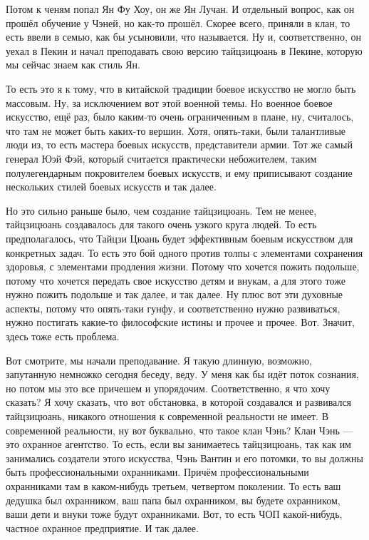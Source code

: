 Потом к ченям попал Ян Фу Хоу,  
он же Ян Лучан.  И отдельный вопрос, как он прошёл 
обучение у Чэней, но как-то прошёл. Скорее всего, 
приняли в клан, то есть ввели в семью, как бы усыновили, 
что называется.  Ну и, соответственно, он уехал в Пекин 
и начал преподавать свою версию тайцзицюань в 
Пекине,  которую мы сейчас знаем как стиль Ян.

То есть 
это я к тому,  что в китайской традиции боевое 
искусство не могло быть массовым. Ну, за исключением 
вот этой военной темы. Но военное боевое искусство, ещё
раз, было каким-то очень ограниченным в плане, ну,  
считалось, что там не может быть каких-то вершин.  Хотя, 
опять-таки,  были талантливые люди из, то есть мастера 
боевых искусств, представители армии. Тот же самый 
генерал Юэй Фэй, который считается практически 
небожителем,  таким полулегендарным покровителем 
боевых искусств,  и ему приписывают создание 
нескольких стилей боевых искусств и так далее.

Но это 
сильно раньше было,  чем создание тайцзицюань. Тем не 
менее,  тайцзицюань создавалось для такого очень 
узкого круга людей.  То есть предполагалось, что Тайцзи 
Цюань будет эффективным боевым искусством для 
конкретных задач. То есть это бой одного против толпы 
с элементами сохранения здоровья, с элементами 
продления жизни. Потому что хочется пожить подольше,  
потому что хочется передать свое искусство детям и 
внукам, а для этого тоже нужно пожить подольше и так 
далее, и так далее. Ну плюс вот эти духовные аспекты, 
потому что опять-таки гунфу, и соответственно нужно 
развиваться, нужно постигать какие-то философские 
истины и прочее и прочее. Вот. Значит,  здесь тоже есть 
проблема.

Вот смотрите, мы начали преподавание.  Я 
такую длинную, возможно, запутанную немножко сегодня 
беседу, веду.  У меня как бы идёт поток 
сознания,  но потом мы это все причешем и упорядочим. 
Соответственно, я что хочу сказать? Я хочу сказать,  
что вот обстановка, в которой создавался и развивался 
тайцзицюань,  никакого отношения к современной 
реальности не имеет. В современной реальности, ну вот 
буквально, что такое клан Чэнь?  Клан Чэнь --- это 
охранное агентство. То есть, если вы занимаетесь 
тайцзицюань, так как им занимались создатели этого 
искусства, Чэнь Вантин и его потомки, то вы должны быть 
профессиональными охранниками. Причём 
профессиональными охранниками там в каком-нибудь 
третьем, четвертом поколении. То есть ваш дедушка был 
охранником,  ваш папа был охранником, вы будете 
охранником, ваши дети и внуки тоже будут охранниками.  
Вот, то есть ЧОП какой-нибудь,  частное 
охранное предприятие. И так далее.

